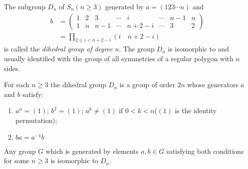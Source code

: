 \begin{definition}
	The subgroup $ D_n $ of $ S_n (n \geqslant 3)$ generated by $ a=(123\cdots n) $ and
	\begin{align}
		b&= \begin{pmatrix}
		1 & 2 & 3 & \cdots & i &\cdots & n-1 & n \\
		1 & n & n-1 & \cdots & n+2-i & \cdots &  3  & 2
		\end{pmatrix} \nonumber\\
	&= \prod_{2\leqslant i < n+2-i} (i \quad n+2-i) \nonumber
	\end{align}
is called the \textit{dihedral group of degree $ n $}. The group $ D_n $ is isomorphic to and usually identified with the group of all symmetries of a regular polygon with $ n $ sides.
\end{definition}
\begin{theorem}
	For each $ n \geqslant 3 $ the dihedral group $ D_n $ is a group of order $ 2n $ whose generators $ a $ and $ b $ satisfy:
	\begin{enumerate}
		\item $ a^n=(1) $; $ b^2=(1)$; $ a^k\neq (1) $ if $ 0<k<n $($ (1) $ is the identity permutation);
		\item $ ba = a^{-1}b $
	\end{enumerate}
Any group $ G $ which is generated by elements $ a,b \in G $ satisfying both conditions for some $ n \geqslant 3 $ is isomorphic to $ D_n $.
\end{theorem}


